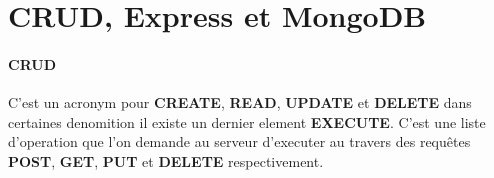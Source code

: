 \section{CRUD, Express et MongoDB}
\paragraph{CRUD}C'est un acronym pour \textbf{CREATE}, \textbf{READ}, \textbf{UPDATE} et \textbf{DELETE} dans certaines denomition il existe un dernier element \textbf{EXECUTE}. C'est une liste d'operation que l'on demande au serveur d'executer au travers des requêtes \textbf{POST}, \textbf{GET}, \textbf{PUT} et \textbf{DELETE} respectivement.
\begin{center}
\end{center}
\subsection{}